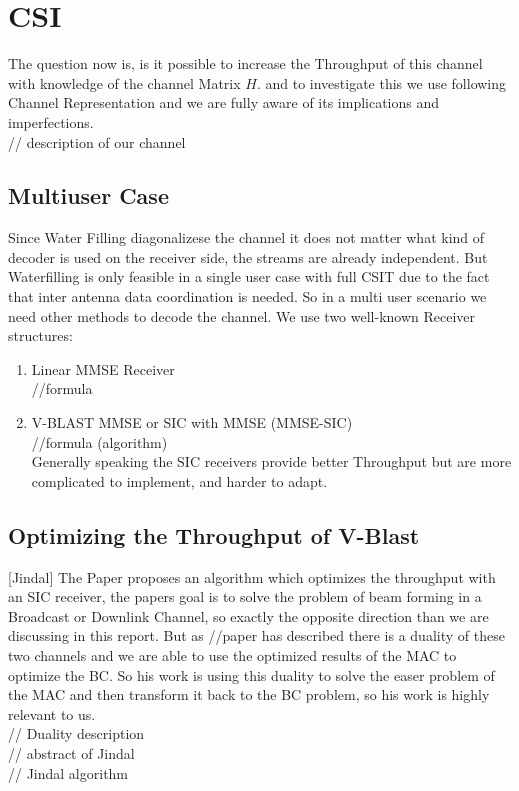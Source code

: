 ﻿
\chapter{CSI}
The question now is, is it possible to increase the Throughput of this channel with knowledge of the channel Matrix $H$. and to investigate this we use following Channel Representation and we are fully aware of its implications and imperfections.
\\// description of our channel


 \section{Multiuser Case}
Since Water Filling diagonalizese the channel it does not matter what kind of decoder is used on the receiver side, the streams are already independent. But Waterfilling is only feasible in a single user case with full CSIT due to the fact that inter antenna data coordination is needed. So in a multi user scenario we need other methods to decode the channel.
We use two well-known Receiver structures:
\begin{enumerate}
	\item Linear MMSE Receiver\\
	//formula
	\item V-BLAST MMSE or SIC with MMSE (MMSE-SIC)\\
	//formula (algorithm)\\
	Generally speaking the SIC receivers provide better Throughput but are more complicated to implement, and harder to adapt.
\end{enumerate}

\section{Optimizing the Throughput of V-Blast}
[Jindal]
The Paper proposes an algorithm which optimizes the throughput with an SIC receiver, the papers goal is to solve the problem of beam forming in a Broadcast or Downlink Channel, so exactly the opposite direction than we are discussing in this report. But as //paper has described there is a duality of these two channels and we are able to use the optimized results of the MAC to optimize the BC. So his work is using this duality to solve the easer problem of the MAC and then transform it back to the BC problem, so his work is highly relevant to us.\\
// Duality description\\
// abstract of Jindal\\
// Jindal algorithm

